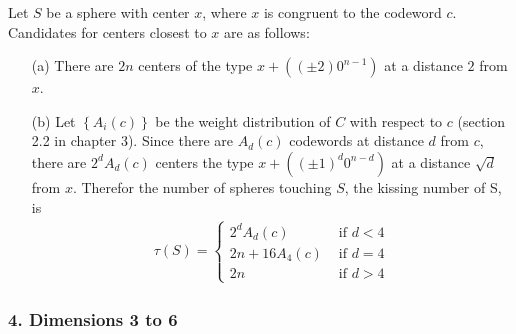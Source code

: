 \documentclass{article}
\renewcommand{\tt}[1]{\text{ #1 }}
\newcommand{\set}[1]{\left\{ #1 \right\}}
\begin{document}
Let $S$ be a sphere with center $x$, where $x$ is congruent to the codeword $c$.
Candidates for centers closest to $x$ are as follows:
\begin{enumerate}
  \item[(a)]
  There are $2n$ centers of the type $x + ((\pm 2) 0^{n-1})$ at a distance $2$ from $x$.

  \item[(b)]
  Let $\set{A_i(c)}$ be the weight distribution of $C$ with respect to $c$ (section 2.2 in chapter 3).
  Since there are $A_d(c)$ codewords at distance $d$ from $c$, there are $2^d A_d(c)$ centers the type $x + ((\pm 1)^d 0^{n-d})$ at a distance $\sqrt d$ from $x$.
  Therefor the number of spheres touching $S$, the kissing number of S, is
  \begin{align*}
    \tau(S) = \begin{cases}
      2^d A_d(c)     &\tt{if} d < 4 \\
      2n + 16 A_4(c) &\tt{if} d = 4 \\
      2n             &\tt{if} d > 4
    \end{cases}
  \end{align*}
\end{enumerate}

\subsubsection*{4. Dimensions 3 to 6}
\end{document}
